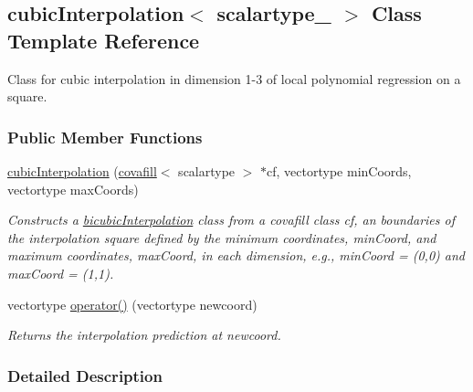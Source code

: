 \hypertarget{classcubicInterpolation}{}\subsection{cubic\+Interpolation$<$ scalartype\+\_\+ $>$ Class Template Reference}
\label{classcubicInterpolation}


Class for cubic interpolation in dimension 1-\/3 of local polynomial regression on a square.  


\subsubsection*{Public Member Functions}
\begin{DoxyCompactItemize}
\item 
\hypertarget{classcubicInterpolation_a315eb8b62c04985416cd0e9fd7655022}{}\hyperlink{classcubicInterpolation_a315eb8b62c04985416cd0e9fd7655022}{cubic\+Interpolation} (\hyperlink{classcovafill}{covafill}$<$ scalartype $>$ $\ast$cf, vectortype min\+Coords, vectortype max\+Coords)\label{classcubicInterpolation_a315eb8b62c04985416cd0e9fd7655022}

\begin{DoxyCompactList}\small\item\em Constructs a \hyperlink{classbicubicInterpolation}{bicubic\+Interpolation} class from a covafill class {\itshape cf}, an boundaries of the interpolation square defined by the minimum coordinates, {\itshape min\+Coord}, and maximum coordinates, {\itshape max\+Coord}, in each dimension, e.\+g., min\+Coord = (0,0) and max\+Coord = (1,1). \end{DoxyCompactList}\item 
\hypertarget{classcubicInterpolation_ac566e2bd2ece485f7e63689316045e59}{}vectortype \hyperlink{classcubicInterpolation_ac566e2bd2ece485f7e63689316045e59}{operator()} (vectortype newcoord)\label{classcubicInterpolation_ac566e2bd2ece485f7e63689316045e59}

\begin{DoxyCompactList}\small\item\em Returns the interpolation prediction at {\itshape newcoord}. \end{DoxyCompactList}\end{DoxyCompactItemize}


\subsubsection{Detailed Description}
